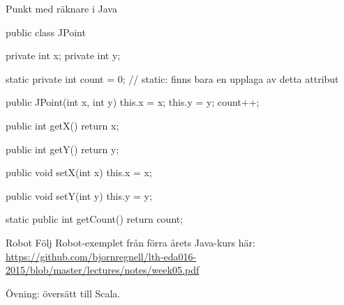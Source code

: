\begin{Slide}{Punkt med räknare i Java}

\begin{Code}[language=Java,basicstyle=\ttfamily\SlideFontSize{5.2}{6}]
public class JPoint {
    private int x;
    private int y;
    
    static private int count = 0;  // static: finns bara en upplaga av detta attribut
    
    public JPoint(int x, int y){
        this.x = x;
        this.y = y;
        count++;
    }  
    
    public int getX(){
        return x;
    }
    
    public int getY(){
        return y;
    }
    
    public void setX(int x){
        this.x = x;
    }
    
    public void setY(int y){
        this.y = y;
    }
    
    static public int getCount(){
       return count;
    }     
}
\end{Code}


\end{Slide}

\begin{Slide}{Robot}
Följ Robot-exemplet från förra årets Java-kurs här: \\\vspace{1em}
\url{https://github.com/bjornregnell/lth-eda016-2015/blob/master/lectures/notes/week05.pdf}
\\\vspace{2em}


Övning: översätt till Scala.
\end{Slide}

\fi










